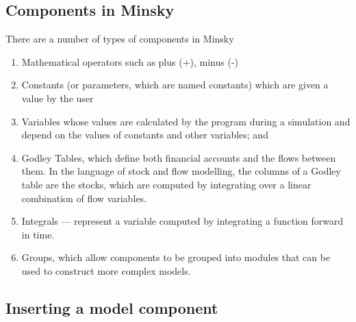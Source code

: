 \subsection{Components in Minsky}

There are a number of types of components in Minsky
\begin{enumerate}
\item Mathematical operators such as plus (+), minus (-)
\item Constants (or parameters, which are named constants) which are
given a value by the user 
\item Variables whose values are calculated by the program during a simulation and depend on the values of constants and other variables; and
\item Godley Tables, which define both financial accounts and the
flows between them. In the language of stock and flow modelling, the
columns of a Godley table are the stocks, which are computed by
integrating over a linear combination of flow variables.
\item Integrals --- represent a variable computed by integrating a
function forward in time.
\item Groups, which allow components to be grouped into modules that
can be used to construct more complex models.
\end{enumerate}


\subsection{Inserting a model component}


